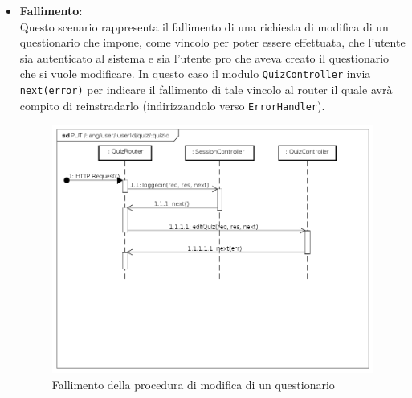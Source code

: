 \begin{itemize}
\item \textbf{Fallimento}:\\
Questo scenario rappresenta il fallimento di una richiesta di modifica di un questionario che impone, come vincolo per poter essere effettuata, che l'utente sia autenticato al sistema e sia l'utente pro che aveva creato il questionario che si vuole modificare. In questo caso il modulo \texttt{QuizController} invia \texttt{next(error)} per indicare il fallimento di tale vincolo al router il quale avrà compito di reinstradarlo (indirizzandolo verso \texttt{ErrorHandler}).
\label{Fallimento della procedura di modifica di un questionario}
\begin{figure}[ht]
	\centering
	\includegraphics[scale=0.40]{UML/DiagrammiDiSequenza/Back-end/PUT__lang_user_userId_quiz_quizId_failure.png}
	\caption{Fallimento della procedura di modifica di un questionario}
\end{figure}
\FloatBarrier
\end{itemize}

